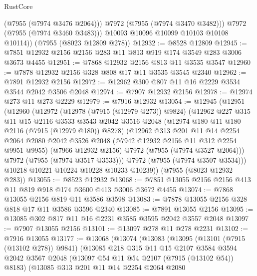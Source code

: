 \begin{lexlean}{RustCore}
\begin{coremodule}
              (@7955 (@7974 @3476 @2064)))
            @7972
            (@7955 (@7974 @3470 @3482)))
          @7972
          (@7955 (@7974 @3460 @3483)))
        @10093
        @10096
        @10099
        @10103
        @10108
        @10114))
    (@7955 (@8023 @12809 @278))
@12932 := @8528 @12809
@12945 := @7851 @12932 @2156 @2156 @283 @11 @813 @919 @174 @3549 @283 @3006 @3673 @4455
@12951 := @7868 @12932 @2156 @813 @11 @3535 @3547
@12960 := @7878 @12932 @2156 @328 @808 @17 @11 @3535 @3545 @2340
@12962 := @7891 @12932 @2156
@12972 := @12962 @300 @807 @11 @16 @2229 @3534 @3544 @2042 @3506 @2048
@12974 := @7907 @12932 @2156
@12978 := @12974 @273 @11 @273 @2229
@12979 := @7916 @12932
@13054 := @12945
    (@12951
      (@12960
        (@12972
          (@12978 (@7915 (@12979 @273)) @9824)
          (@12962
            @227
            @315
            @11
            @15
            @2116
            @3533
            @3543
            @2042
            @3516
            @2048
            (@12974 @180 @11 @180 @2116 (@7915 (@12979 @180)) @8278)
            (@12962
              @313
              @201
              @11
              @14
              @2254
              @2064
              @2080
              @2042
              @3526
              @2048
              (@7942 @12932 @2156 @11 @312 @2254 @9951 @9955)
              (@7966 @12932 @2156)
              @7972
              (@7955 (@7974 @3527 @2064)))
            @7972
            (@7955 (@7974 @3517 @3533)))
          @7972
          (@7955 (@7974 @3507 @3534)))
        @10218
        @10221
        @10224
        @10228
        @10233
        @10239))
    (@7955 (@8023 @12932 @283))
@13055 := @8523 @12932
@13068 := @7851 @13055 @2156 @2156 @413 @11 @819 @918 @174 @3600 @413 @3006 @3672 @4455
@13074 := @7868 @13055 @2156 @819 @11 @3586 @3598
@13083 := @7878 @13055 @2156 @328 @818 @17 @11 @3586 @3596 @2340
@13085 := @7891 @13055 @2156
@13095 := @13085 @302 @817 @11 @16 @2231 @3585 @3595 @2042 @3557 @2048
@13097 := @7907 @13055 @2156
@13101 := @13097 @278 @11 @278 @2231
@13102 := @7916 @13055
@13177 := @13068
    (@13074
      (@13083
        (@13095
          (@13101 (@7915 (@13102 @278)) @9841)
          (@13085
            @218
            @315
            @11
            @15
            @2107
            @3584
            @3594
            @2042
            @3567
            @2048
            (@13097 @54 @11 @54 @2107 (@7915 (@13102 @54)) @8183)
            (@13085
              @313
              @201
              @11
              @14
              @2254
              @2064
              @2080

\end{coremodule}
\end{lexlean}
